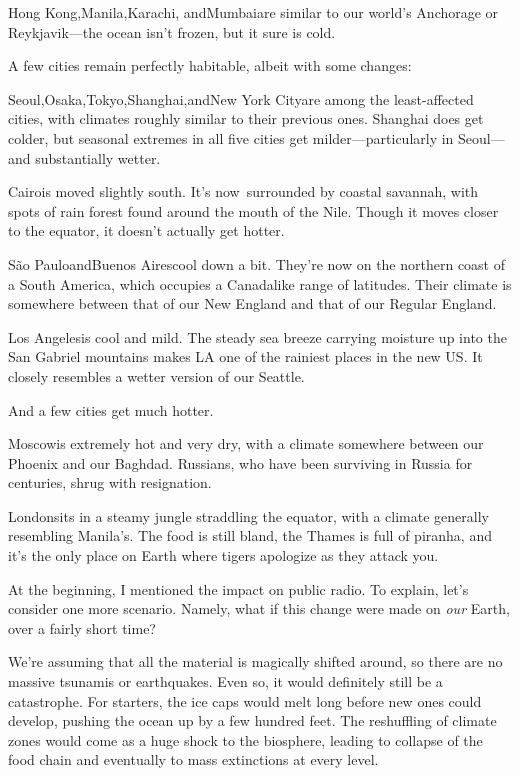 {Hong Kong,Manila,Karachi, andMumbaiare similar to our world’s Anchorage or Reykjavik—the ocean isn’t frozen, but it sure is cold.}

{A few cities remain perfectly habitable, albeit with some changes:}

{Seoul,Osaka,Tokyo,Shanghai,andNew York Cityare among the least-affected cities, with climates roughly similar to their previous ones. Shanghai does get colder, but seasonal extremes in all five cities get milder—particularly in Seoul—and substantially wetter.}

{Cairois moved slightly south. It’s now surrounded by coastal savannah, with spots of rain forest found around the mouth of the Nile. Though it moves closer to the equator, it doesn’t actually get hotter.}

{São PauloandBuenos Airescool down a bit. They’re now on the northern coast of a South America, which occupies a Canadalike range of latitudes. Their climate is somewhere between that of our New England and that of our Regular England.}

{Los Angelesis cool and mild. The steady sea breeze carrying moisture up into the San Gabriel mountains makes LA one of the rainiest places in the new US. It closely resembles a wetter version of our Seattle.}

{And a few cities get much hotter.}

{Moscowis extremely hot and very dry, with a climate somewhere between our Phoenix and our Baghdad. Russians, who have been surviving in Russia for centuries, shrug with resignation.}

{Londonsits in a steamy jungle straddling the equator, with a climate generally resembling Manila's. The food is still bland, the Thames is full of piranha, and it's the only place on Earth where tigers apologize as they attack you.}

{At the beginning, I mentioned the impact on public radio. To explain, let’s consider one more scenario. Namely, what if this change were made on \emph{our} Earth, over a fairly short time?}

{We’re assuming that all the material is magically shifted around, so there are no massive tsunamis or earthquakes. Even so, it would definitely still be a catastrophe. For starters, the ice caps would melt long before new ones could develop, pushing the ocean up by a few hundred feet. The reshuffling of climate zones would come as a huge shock to the biosphere, leading to collapse of the food chain and eventually to mass extinctions at every level.}


